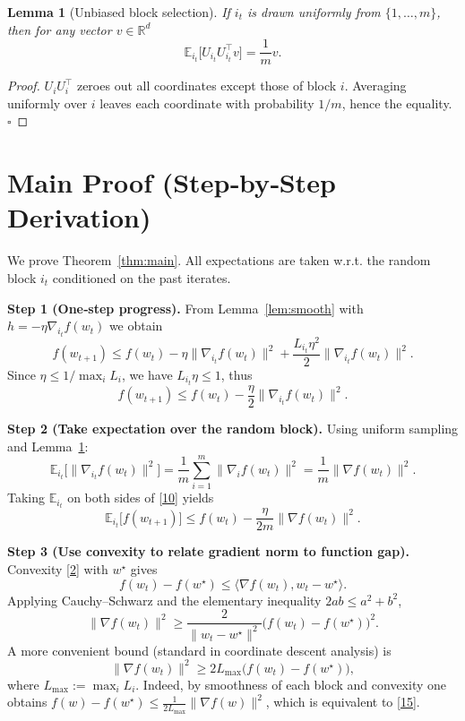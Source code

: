 \documentclass{article}
\newtheorem{lemma}{Lemma}
\newcommand{\E}{\mathbb{E}}
\newcommand{\R}{\mathbb{R}}
\begin{document}
\begin{lemma}[Unbiased block selection]\label{lem:unbiased}
If $i_t$ is drawn uniformly from $\{1,\dots,m\}$, then for any vector $v\in\R^{d}$
\[
\E_{i_t}\!\bigl[U_{i_t}U_{i_t}^{\top} v\bigr]=\frac1m v .
\tag{8}
\]
\end{lemma}
\begin{proof}
$U_{i}U_{i}^{\top}$ zeroes out all coordinates except those of block $i$.
Averaging uniformly over $i$ leaves each coordinate with probability $1/m$,
hence the equality. \hfill $\square$
\end{proof}

\section*{Main Proof (Step‑by‑Step Derivation)}
We prove Theorem~\ref{thm:main}.  
All expectations are taken w.r.t. the random block $i_t$ conditioned on
the past iterates.

\noindent\textbf{Step 1 (One‑step progress).}  
From Lemma~\ref{lem:smooth} with $h=-\eta \nabla_{i_t}f(w_t)$ we obtain
\[
f(w_{t+1})
\le f(w_t)-\eta\|\nabla_{i_t}f(w_t)\|^{2}
+\frac{L_{i_t}\eta^{2}}{2}\|\nabla_{i_t}f(w_t)\|^{2}.
\tag{9}
\]
Since $\eta\le 1/\max_i L_i$, we have $L_{i_t}\eta\le 1$, thus
\[
f(w_{t+1})\le f(w_t)-\frac{\eta}{2}\|\nabla_{i_t}f(w_t)\|^{2}.
\tag{10}
\]

\noindent\textbf{Step 2 (Take expectation over the random block).}  
Using uniform sampling and Lemma~\ref{lem:unbiased}:
\[
\E_{i_t}\!\bigl[\|\nabla_{i_t}f(w_t)\|^{2}\bigr]
= \frac1m\sum_{i=1}^{m}\|\nabla_i f(w_t)\|^{2}
= \frac1m\|\nabla f(w_t)\|^{2}.
\tag{11}
\]
Taking $\E_{i_t}$ on both sides of \eqref{10} yields
\[
\E_{i_t}\!\bigl[f(w_{t+1})\bigr]
\le f(w_t)-\frac{\eta}{2m}\|\nabla f(w_t)\|^{2}.
\tag{12}
\]

\noindent\textbf{Step 3 (Use convexity to relate gradient norm to function gap).}  
Convexity \eqref{2} with $w^{\star}$ gives
\[
f(w_t)-f(w^{\star})\le\langle \nabla f(w_t),w_t-w^{\star}\rangle .
\tag{13}
\]
Applying Cauchy–Schwarz and the elementary inequality
$2ab\le a^{2}+b^{2}$,
\[
\|\nabla f(w_t)\|^{2}
\ge \frac{2}{\|w_t-w^{\star}\|^{2}}\bigl(f(w_t)-f(w^{\star})\bigr)^{2}.
\tag{14}
\]
A more convenient bound (standard in coordinate descent analysis) is
\[
\|\nabla f(w_t)\|^{2}
\ge 2L_{\max}\bigl(f(w_t)-f(w^{\star})\bigr),
\tag{15}
\]
where $L_{\max}:=\max_i L_i$.
Indeed, by smoothness of each block and convexity one obtains
$f(w)-f(w^{\star})\le \frac{1}{2L_{\max}}\|\nabla f(w)\|^{2}$,
which is equivalent to \eqref{15}.
\end{document}
